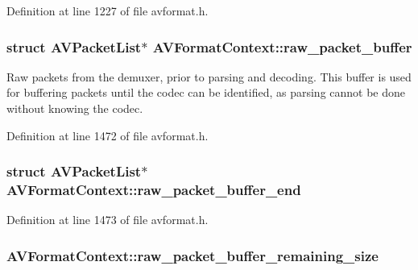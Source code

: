 Definition at line 1227 of file avformat.\+h.

\subsubsection[{\texorpdfstring{raw\+\_\+packet\+\_\+buffer}{raw_packet_buffer}}]{\setlength{\rightskip}{0pt plus 5cm}struct {\bf A\+V\+Packet\+List}$\ast$ A\+V\+Format\+Context\+::raw\+\_\+packet\+\_\+buffer}\hypertarget{struct_a_v_format_context_a8ca5b3ff8a0e4e3523ebc3f320660e4c}{}\label{struct_a_v_format_context_a8ca5b3ff8a0e4e3523ebc3f320660e4c}
Raw packets from the demuxer, prior to parsing and decoding. This buffer is used for buffering packets until the codec can be identified, as parsing cannot be done without knowing the codec. 

Definition at line 1472 of file avformat.\+h.

\subsubsection[{\texorpdfstring{raw\+\_\+packet\+\_\+buffer\+\_\+end}{raw_packet_buffer_end}}]{\setlength{\rightskip}{0pt plus 5cm}struct {\bf A\+V\+Packet\+List}$\ast$ A\+V\+Format\+Context\+::raw\+\_\+packet\+\_\+buffer\+\_\+end}\hypertarget{struct_a_v_format_context_a88d15460d48097522af38525fbfc2f21}{}\label{struct_a_v_format_context_a88d15460d48097522af38525fbfc2f21}


Definition at line 1473 of file avformat.\+h.

\subsubsection[{\texorpdfstring{raw\+\_\+packet\+\_\+buffer\+\_\+remaining\+\_\+size}{raw_packet_buffer_remaining_size}}]{ A\+V\+Format\+Context\+::raw\+\_\+packet\+\_\+buffer\+\_\+remaining\+\_\+size}\hypertarget{struct_a_v_format_context_a26c2db682c45c75d22246ef66e9fe838}{}\label{struct_a_v_format_context_a26c2db682c45c75d22246ef66e9fe838}


